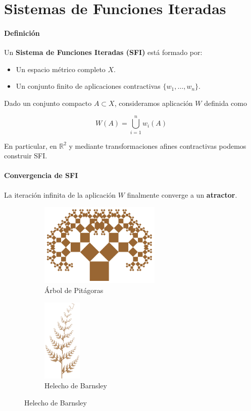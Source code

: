 \section{Sistemas de Funciones Iteradas}

\begin{frame}{\insertsectionhead}
\framesubtitle{Definición}
{\large 
Un \textbf{Sistema de Funciones Iteradas (SFI)} está formado por:
\begin{itemize}
    \item Un espacio métrico completo $X$.
    \item Un conjunto finito de aplicaciones contractivas $\{w_1,\dots,w_n\}.$
\end{itemize}

Dado un conjunto compacto $A\subset X$, consideramos aplicación $W$ definida como

$$
W(A) = \bigcup_{i=1}^n w_i(A) 
$$

En particular, en $\mathbb R^2$ y mediante transformaciones afines contractivas podemos construir SFI.
}
\end{frame}

\begin{frame}{\insertsectionhead}
\framesubtitle{Convergencia de SFI}

{\large La iteración infinita de la aplicación $W$ finalmente converge a un \textbf{atractor}.}

\begin{figure}[ht!]
\hspace{\fill}
\begin{subfigure}[b]{0.4\textwidth}
  \includegraphics[height=4cm]{screenshots/arbol-pitagoras.png}
  \caption*{Árbol de Pitágoras}
\end{subfigure}
\hspace{\fill}
\begin{subfigure}[b]{0.2\textwidth}
  \includegraphics[height=4cm]{screenshots/helecho-barnsley.png}
  \caption*{Helecho de Barnsley}
\end{subfigure}
\hspace{\fill}
\end{figure}
    
\end{frame}

